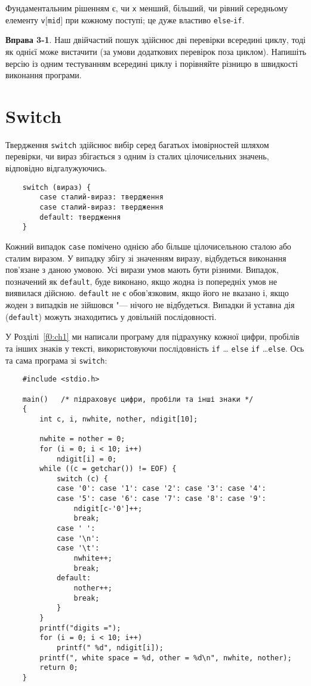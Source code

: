 \documentclass[a4paper,12pt]{book}
\begin{document}
  Фундаментальним рішенням є, чи \texttt{x} менший, більший, чи рівний середньому елементу
  \texttt{v\mbox{$[$}mid\mbox{$]$}} при кожному поступі; це дуже властиво \texttt{else}-\texttt{if}.

  \textbf{Вправа 3-1}. Наш двійчастий пошук здійснює дві перевірки всередині циклу, тоді як
  однієї може вистачити (за умови додаткових перевірок поза циклом). Напишіть версію із
  одним тестуванням всередині циклу і порівняйте різницю в швидкості виконання
  програми.

\section{Switch}

\label{f0:ch3.4}
  Твердження \texttt{switch} здійснює вибір серед багатьох імовірностей шляхом перевірки,
  чи вираз збігається з одним із сталих цілочисельних значень, відповідно відгалужуючись.
  \begin{verbatim}
    switch (вираз) {
        case сталий-вираз: твердження
        case сталий-вираз: твердження
        default: твердження
    }
  \end{verbatim}

  Кожний випадок \texttt{case} помічено однією або більше цілочисельною сталою або сталим
  виразом. У випадку збігу зі значенням виразу, відбудеться виконання пов'язане з даною
  умовою. Усі вирази умов мають бути різними. Випадок, позначений як \texttt{default},
  буде виконано, якщо жодна із попередніх умов не виявилася дійсною. \texttt{default} не є
  обов'язковим, якщо його не вказано і, якщо жоден з випадків не зійшовся "--- нічого
  не відбудеться. Випадки й уставна дія (\texttt{default}) можуть знаходитись у довільній
  послідовності.

  У Розділі~\ref{f0:ch1} ми написали програму для підрахунку кожної цифри,
  пробілів та інших знаків у тексті, використовуючи послідовність \texttt{if} \ldots
  \texttt{else} \texttt{if} \ldots \texttt{else}. Ось та сама програма зі \texttt{switch}:
  \begin{verbatim}
    #include <stdio.h>

    main()   /* підраховує цифри, пробіли та інші знаки */
    {
        int c, i, nwhite, nother, ndigit[10];

        nwhite = nother = 0;
        for (i = 0; i < 10; i++)
            ndigit[i] = 0;
        while ((c = getchar()) != EOF) {
            switch (c) {
            case '0': case '1': case '2': case '3': case '4':
            case '5': case '6': case '7': case '8': case '9':
                ndigit[c-'0']++;
                break;
            case ' ':
            case '\n':
            case '\t':
                nwhite++;
                break;
            default:
                nother++;
                break;
            }
        }
        printf("digits =");
        for (i = 0; i < 10; i++)
            printf(" %d", ndigit[i]);
        printf(", white space = %d, other = %d\n", nwhite, nother);
        return 0;
    }
  \end{verbatim}
\end{document}
